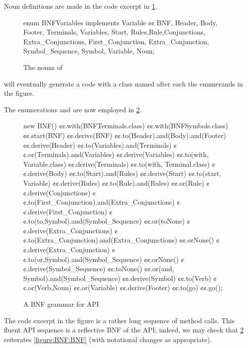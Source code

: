 Noun definitions are made in the code excerpt in \cref{figure:Nouns}.

\begin{figure}[htb]
  \begin{JAVA}[style=code]
enum BNFVariables implements Variable {¢¢
  BNF, Header, Body, Footer,
  Terminals, Variables, Start,
  Rules,Rule,Conjunctions, Extra_Conjunctions,
  First_Conjunction, Extra_Conjunction, Symbol_Sequence,
  Symbol, Variable, Noun;
}\end{JAVA}
  \caption{The nouns of \Self}
  \label{figure:Nouns}
\end{figure}
  \Self will eventually generate a code with
  a class named after each the enumerands in the figure.

The
enumerations  and
  are now employed in \cref{figure:BNF:fluent}.

\begin{figure}[htb]
  \begin{JAVA}[style=numbered]
new BNF()
  ¢¢.with(BNFTerminals.class)
  ¢¢.with(BNFSymbols.class)
  ¢¢.start(BNF)
  ¢¢.derive(BNF)
    ¢¢.to(Header).and(Body).and(Footer)
  ¢¢.derive(Header)
    ¢¢.to(Variables).and(Terminals)
    ¢¢.or(Terminals).and(Variables)
  ¢¢.derive(Variables)
    ¢¢.to(with, Variable.class)
  ¢¢.derive(Terminals)
    ¢¢.to(with, Terminal.class)
  ¢¢.derive(Body)
    ¢¢.to(Start).and(Rules)
  ¢¢.derive(Start)
    ¢¢.to(start, Variable)
  ¢¢.derive(Rules)
    ¢¢.to(Rule).and(Rules)
    ¢¢.or(Rule)
  ¢¢.derive(Conjunctions)
    ¢¢.to(First_Conjunction).and(Extra_Conjunctions)
  ¢¢.derive(First_Conjunction)
    ¢¢.to(to,Symbol).and(Symbol_Sequence)
    ¢¢.or(toNone)
  ¢¢.derive(Extra_Conjunctions)
    ¢¢.to(Extra_Conjunction).and(Extra_Conjunctions)
    ¢¢.orNone()
  ¢¢.derive(Extra_Conjunction)
    ¢¢.to(or,Symbol).and(Symbol_Sequence)
    ¢¢.orNone()
  ¢¢.derive(Symbol_Sequence)
    ¢¢.toNone()
    ¢¢.or(and, Symbol).and(Symbol_Sequence)
  ¢¢.derive(Symbol)
    ¢¢.to(Verb)
    ¢¢.or(Verb,Noun)
    ¢¢.or(Variable)
  ¢¢.derive(Footer)
    ¢¢.to(go)
¢¢.go();
\end{JAVA}
  \caption{A BNF grammar for \Self API}
  \label{figure:BNF:fluent}
\end{figure}

The code excerpt in the figure is a rather long
  sequence of method calls.
This fluent API sequence is a reflective BNF
  of the \Self API;
  indeed, we may check that \cref{figure:BNF:fluent} reiterates \cref{figure:BNF:BNF}
  (with notational changes as appropriate).

